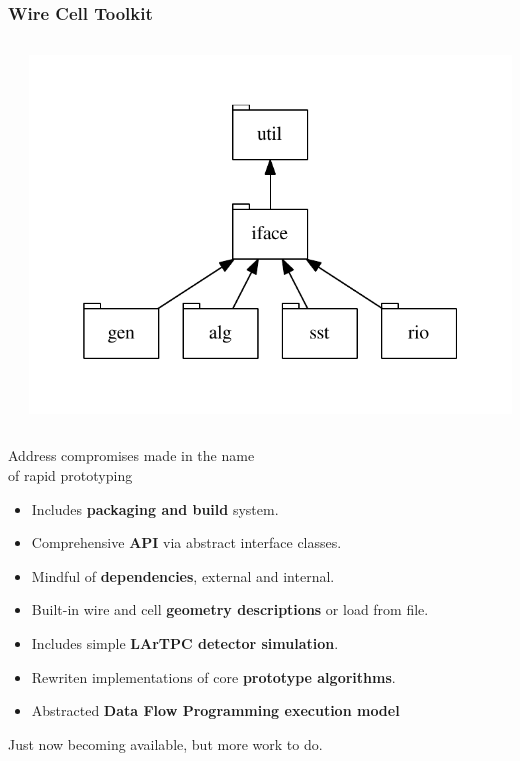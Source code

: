 \begin{frame}
  \frametitle{Wire Cell Toolkit}

  \begin{columns}
    \begin{column}{0.65\paperwidth}
    \end{column}
    \begin{column}{0.35\paperwidth}
      \vspace{-20mm}
      \includegraphics[width=\textwidth]{deps.pdf}      
    \end{column}
  \end{columns}

  \vspace{-15mm}

  Address compromises made in the name\\
  of rapid prototyping 
  \begin{itemize}
  \item Includes \textbf{packaging and build} system.
  \item Comprehensive \textbf{API} via abstract interface classes.
  \item Mindful of \textbf{dependencies}, external and internal.
  \item Built-in wire and cell \textbf{geometry descriptions} or load from file.
  \item Includes simple \textbf{LArTPC detector simulation}.
  \item Rewriten implementations of core \textbf{prototype algorithms}.
  \item Abstracted \textbf{Data Flow Programming execution model}
  \end{itemize}

  \vfill

  Just now becoming available, but more work to do.

\end{frame}

